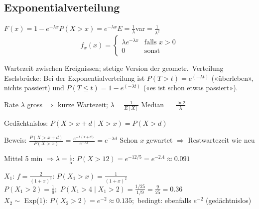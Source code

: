 \subsection{Exponentialverteilung}
\begin{formel}
$F(x)=1-e^{-\lambda x}$\quad $P(X>x)=e^{-\lambda x}$\quad $E=\frac1\lambda$\quad var$=\frac1{\lambda^2}$
\[ f_x(x) = \begin{cases} \lambda e^{-\lambda x} & \text{falls } x > 0 \\ 0 & \text{sonst} \end{cases} \]

\end{formel}
\begin{itemize}
\pfeil Wartezeit zwischen Ereignissen; stetige Version der geometr.\ Verteilung
\pfeil Eselsbrücke: Bei der Exponentialverteilung ist $P(T > t) = e^{(-\lambda t)}$ («überleben», nichts passiert) und $P(T \leq t) = 1 - e^{(-\lambda t)}$ («es ist schon etwas passiert»).

\pfeil Rate $\lambda$ gross $\Rightarrow$ kurze Wartezeit; $\lambda=\frac1{E[X]}$
\pfeil Median $=\frac{\ln2}{\lambda}$
\end{itemize}
\begin{formel}
Gedächtnislos: $P(X>x+d\mid X>x)=P(X>d)$
\end{formel}
\begin{itemize}
\pfeil Beweis: $\frac{P(X>x+d)}{P(X>x)}=\frac{e^{-\lambda(x+d)}}{e^{-\lambda x}}=e^{-\lambda d}$
\pfeil Schon $x$ gewartet $\Rightarrow$ Restwartezeit wie neu
\end{itemize}
\begin{bsp}[{{Postschalter (4.2.2)}}]
Mittel 5 min $\Rightarrow\lambda=\frac15$: $P(X>12)=e^{-12/5}=e^{-2.4}\approx0.091$
\end{bsp}
\begin{bsp}[{{Kofferträger (4.2.3)}}]
$X_1$: $f=\frac2{(1+x)^3}$: $P(X_1>x)=\frac1{(1+x)^2}$\\
$P(X_1>2)=\frac19$;\ $P(X_1>4\mid X_1>2)=\frac{1/25}{1/9}=\frac9{25}=0.36$\\
$X_2\sim$ Exp(1): $P(X_2>2)=e^{-2}\approx0.135$;\ bedingt: ebenfalls $e^{-2}$ (gedächtnislos)
\end{bsp}

